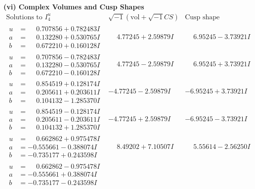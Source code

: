 \documentclass[1p]{elsarticle_modified}
\theoremstyle{definition}
\newcommand{\I}{\sqrt{-1}}
\begin{document}
\newpage\flushleft \textbf{(vi) Complex Volumes and Cusp Shapes}
$$\begin{array}{c|c|c}  
\text{Solutions to }I^u_{4}& \I (\text{vol} + \sqrt{-1}CS) & \text{Cusp shape}\\
 \hline 
\begin{aligned}
u &= \phantom{-}0.707856 + 0.782483 I \\
a &= \phantom{-}0.132280 + 0.530765 I \\
b &= \phantom{-}0.672210 + 0.160128 I\end{aligned}
 & \phantom{-}4.77245 + 2.59879 I & \phantom{-}6.95245 - 3.73921 I \\ \hline\begin{aligned}
u &= \phantom{-}0.707856 - 0.782483 I \\
a &= \phantom{-}0.132280 - 0.530765 I \\
b &= \phantom{-}0.672210 - 0.160128 I\end{aligned}
 & \phantom{-}4.77245 - 2.59879 I & \phantom{-}6.95245 + 3.73921 I \\ \hline\begin{aligned}
u &= \phantom{-}0.854519 + 0.128174 I \\
a &= \phantom{-}0.205611 + 0.203611 I \\
b &= \phantom{-}0.104132 - 1.285370 I\end{aligned}
 & -4.77245 - 2.59879 I & -6.95245 + 3.73921 I \\ \hline\begin{aligned}
u &= \phantom{-}0.854519 - 0.128174 I \\
a &= \phantom{-}0.205611 - 0.203611 I \\
b &= \phantom{-}0.104132 + 1.285370 I\end{aligned}
 & -4.77245 + 2.59879 I & -6.95245 - 3.73921 I \\ \hline\begin{aligned}
u &= \phantom{-}0.662862 + 0.975478 I \\
a &= -0.555661 - 0.388074 I \\
b &= -0.735177 + 0.243598 I\end{aligned}
 & \phantom{-}8.49202 + 7.10507 I & \phantom{-}5.55614 - 2.56250 I \\ \hline\begin{aligned}
u &= \phantom{-}0.662862 - 0.975478 I \\
a &= -0.555661 + 0.388074 I \\
b &= -0.735177 - 0.243598 I\end{aligned}

\end{array}$$
\end{document}
